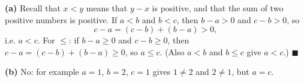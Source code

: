 \textbf{(a)} Recall that $x<y$ means that $y-x$ is positive, and that the sum of two positive numbers is positive. If $a<b$ and $b<c$, then $b-a>0$ and $c-b>0$, so
\[c-a=(c-b)+(b-a)>0,\]
i.e. $a<c$. For $\le$: if $b-a\ge0$ and $c-b\ge0$, then $c-a=(c-b)+(b-a)\ge0$, so $a\le c$. (Also $a<b$ and $b\le c$ give $a<c$.) $\blacksquare$

\textbf{(b)} $\boxed{\text{No}}$: for example $a=1$, $b=2$, $c=1$ gives $1\ne2$ and $2\ne1$, but $a=c$.
